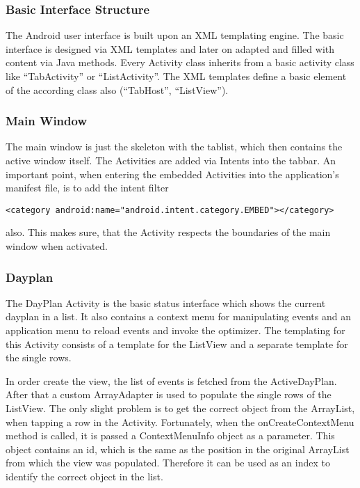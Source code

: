 \subsubsection{Basic Interface Structure} %
\label{ssub:Basic Interface Structure}
The Android user interface is built upon an XML templating engine.
The basic interface is designed via XML templates and later on adapted
and filled with content via Java methods. Every Activity class inherits
from a basic activity class like ``TabActivity'' or ``ListActivity''.
The XML templates define a basic element of the according class also
(``TabHost'', ``ListView'').


\subsubsection{Main Window} %
\label{ssub:MainWindow}

The main window is just the skeleton with the tablist, which then
contains the active window itself. The Activities are added
via Intents into the tabbar. An important point, when entering the embedded
Activities into the application's manifest file, is to add the intent filter
\begin{verbatim}
<category android:name="android.intent.category.EMBED"></category>
\end{verbatim}
also. This makes sure, that the Activity respects the boundaries of the
main window when activated.


\subsubsection{Dayplan} %
\label{ssub:Dayplan}
The DayPlan Activity is the basic status interface which shows the current
dayplan in a list. It also contains a context menu for manipulating events
and an application menu to reload events and invoke the optimizer. The
templating for this Activity consists of a template for the ListView and a
separate template for the single rows.

In order create the view, the list of events is fetched from the
ActiveDayPlan. After that a custom ArrayAdapter is used to populate the
single rows of the ListView.
The only slight problem is to get the correct object from the ArrayList,
when tapping a row in the Activity. Fortunately, when the onCreateContextMenu
method is called, it is passed a ContextMenuInfo object as a parameter. This
object contains an id, which is the same as the position in the original
ArrayList from which the view was populated. Therefore it can be used as an
index to identify the correct object in the list.

